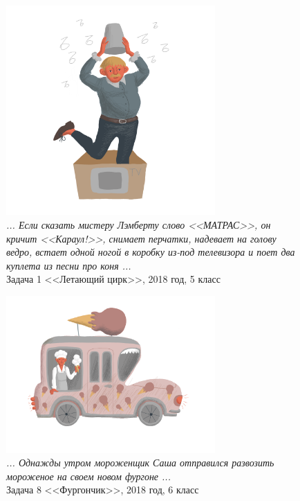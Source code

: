 \documentclass[10pt]{scrbook} \usepackage{modules/nonstahp_book}
\begin{document}
\begin{figure} \begin{center}
	\includegraphics[width=8cm]{figures/color/09}
	\caption{
             {\itshape ... Если сказать мистеру Лэмберту слово <<МАТРАС>>, он кричит <<Караул!>>, 
              снимает перчатки, надевает на голову ведро, встает одной ногой в коробку 
              из-под телевизора и поет два куплета из песни про коня ...}\\
             {Задача 1 <<Летающий цирк>>, 2018 год, 5 класс}}
\end{center} \end{figure}

\begin{figure} \begin{center}
	\includegraphics[width=8cm]{figures/color/10}
	\caption{
             {\itshape ... Однажды утром мороженщик Саша отправился развозить мороженое 
             на своем новом фургоне ...}\\
             {Задача 8 <<Фургончик>>, 2018 год, 6 класс}}
\end{center} \end{figure}
\end{document}
